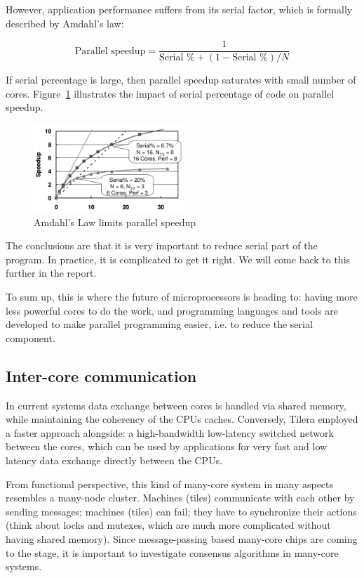 \documentclass[english,11pt]{l4proj}
\begin{document}
However, application performance suffers from its serial factor, which is
formally described by Amdahl's law:

$$
\text{Parallel speedup} =
\frac{1}{\text{Serial \%} + (1 - \text{Serial \%}) / N}
$$

If serial percentage is large, then parallel speedup saturates with small number
of cores. Figure~\ref{fig:amdahl} illustrates the impact of serial
percentage of code on parallel speedup.

\begin{figure}[h]
    \centering
    \includegraphics[width=0.5\textwidth]{images/amdahl.png}
    \caption{Amdahl's Law limits parallel speedup\cite{future-microprocessors}}
    \label{fig:amdahl}
\end{figure}

The conclusions are that it is very important to reduce serial part of the
program. In practice, it is complicated to get it right. We will come back to
this further in the report.

To sum up, this is where the future of microprocessors is heading to: having
more less powerful cores to do the work\cite{future-microprocessors}, and
programming languages and tools are developed to make parallel programming
easier, i.e. to reduce the serial component.

\subsection{Inter-core communication}

In current systems data exchange between cores is handled via shared memory,
while maintaining the coherency of the CPUs caches. Conversely, Tilera employed
a faster approach alongside: a high-bandwidth low-latency switched network
between the cores, which can be used by applications for very fast and low
latency data exchange directly between the CPUs\cite{tile64}.

From functional perspective, this kind of many-core system in many aspects
resembles a many-node cluster. Machines (tiles) communicate with each other by
sending messages; machines (tiles) can fail; they have to synchronize their
actions (think about locks and mutexes, which are much more complicated without
having shared memory). Since message-passing based many-core chips are coming to
the stage, it is important to investigate consensus algorithms in many-core
systems.
\end{document}
